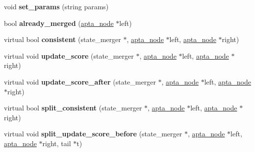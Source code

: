 \begin{DoxyCompactItemize}
\item 
\mbox{\label{classevaluation__function_adc695522b494e728ec75b9512c48a2af}} 
void {\bfseries set\+\_\+params} (string params)
\item 
\mbox{\label{classevaluation__function_a66ed8b822b6cf90b37716edf50314886}} 
bool {\bfseries already\+\_\+merged} (\hyperlink{classapta__node}{apta\+\_\+node} $\ast$left)
\item 
\mbox{\label{classevaluation__function_ac226c4fd2b73272b4ef7fa94f9a45744}} 
virtual bool {\bfseries consistent} (state\+\_\+merger $\ast$, \hyperlink{classapta__node}{apta\+\_\+node} $\ast$left, \hyperlink{classapta__node}{apta\+\_\+node} $\ast$right)
\item 
\mbox{\label{classevaluation__function_afabbf2a4ce4af020707fba03d171f75e}} 
virtual void {\bfseries update\+\_\+score} (state\+\_\+merger $\ast$, \hyperlink{classapta__node}{apta\+\_\+node} $\ast$left, \hyperlink{classapta__node}{apta\+\_\+node} $\ast$right)
\item 
\mbox{\label{classevaluation__function_ab2fd91d601c6b3d8ef7876b6c4b3d115}} 
virtual void {\bfseries update\+\_\+score\+\_\+after} (state\+\_\+merger $\ast$, \hyperlink{classapta__node}{apta\+\_\+node} $\ast$left, \hyperlink{classapta__node}{apta\+\_\+node} $\ast$right)
\item 
\mbox{\label{classevaluation__function_a6235daa1103c4bf235205ed0b485f5b3}} 
virtual bool {\bfseries split\+\_\+consistent} (state\+\_\+merger $\ast$, \hyperlink{classapta__node}{apta\+\_\+node} $\ast$left, \hyperlink{classapta__node}{apta\+\_\+node} $\ast$right)
\item 
\mbox{\label{classevaluation__function_ae9cf7fb31787a3d0c045e525dbbd310a}} 
virtual void {\bfseries split\+\_\+update\+\_\+score\+\_\+before} (state\+\_\+merger $\ast$, \hyperlink{classapta__node}{apta\+\_\+node} $\ast$left, \hyperlink{classapta__node}{apta\+\_\+node} $\ast$right, tail $\ast$t)
\item 
\mbox{\label{classevaluation__function_a8b7af67fae29eb93394fe90cd0b6f9f2}} 

\end{DoxyCompactItemize}

